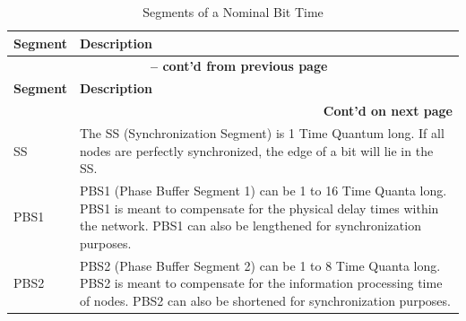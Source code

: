 \begin{longtable}[c]{| l | p{14cm} |}
    
  \caption{Segments of a Nominal Bit Time}
  \label{tab:twai-seg-of-a-nominal-bit-time} 
  \\\hline
  \rowcolor{lightgray}
    \textbf{Segment} & \textbf{Description}
  \\\hline
  \endfirsthead
  
  \multicolumn{2}{c}{\bfseries \tablename\ \thetable{} -- cont'd from previous page}\\\hline
 
  \rowcolor{lightgray}
    \textbf{Segment} & \textbf{Description}\\\hline
  \endhead
  \multicolumn{2}{r}{\textbf{Cont'd on next page}} \\
  \endfoot
  \hline
  \endlastfoot

    SS & The SS (Synchronization Segment) is 1 Time Quantum long. If all nodes are perfectly synchronized, the edge of a bit will lie in the SS.
            \\\hline
    PBS1 & PBS1 (Phase Buffer Segment 1) can be 1 to 16 Time Quanta long. PBS1 is meant to compensate for the physical delay times within the network. PBS1 can also be lengthened for synchronization purposes.
            \\\hline
    PBS2 & PBS2 (Phase Buffer Segment 2) can be 1 to 8 Time Quanta long. PBS2 is meant to compensate for the information processing time of nodes. PBS2 can also be shortened for synchronization purposes.
            \\\hline
    
\end{longtable}
